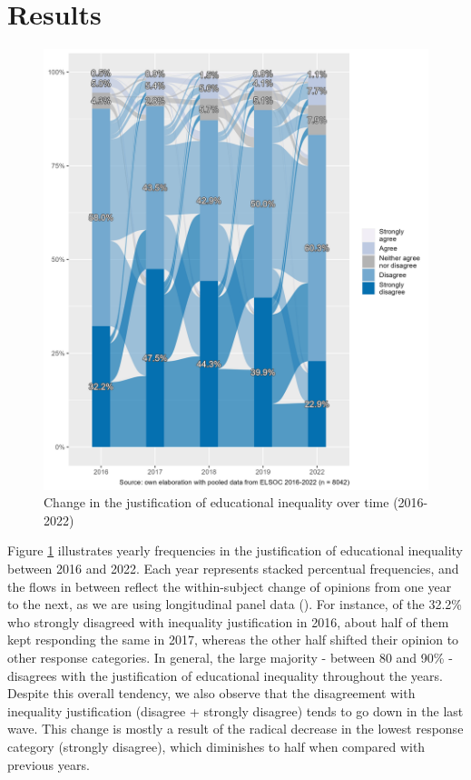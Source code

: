 \documentclass[
  12pt,
  a4paper,
]{article}
\begin{document}
\section{Results}\label{results}

\begin{figure}[H]

{\centering \includegraphics[width=0.85\linewidth]{output/graphs/alluvial_dep} 

}

\caption{Change in the justification of educational inequality over time (2016-2022)}\label{fig:alluvial}
\end{figure}

Figure \ref{fig:alluvial} illustrates yearly frequencies in the justification of educational inequality between 2016 and 2022. Each year represents stacked percentual frequencies, and the flows in between reflect the within-subject change of opinions from one year to the next, as we are using longitudinal panel data (). For instance, of the 32.2\% who strongly disagreed with inequality justification in 2016, about half of them kept responding the same in 2017, whereas the other half shifted their opinion to other response categories. In general, the large majority - between 80 and 90\% - disagrees with the justification of educational inequality throughout the years. Despite this overall tendency, we also observe that the disagreement with inequality justification (disagree + strongly disagree) tends to go down in the last wave. This change is mostly a result of the radical decrease in the lowest response category (strongly disagree), which diminishes to half when compared with previous years.
\end{document}

